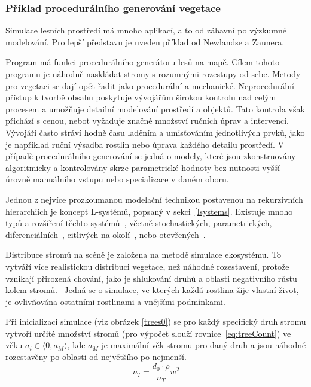 \subsubsection{Příklad procedurálního generování vegetace}
\label{proceduralExample}
Simulace lesních prostředí má mnoho aplikací, a to od zábavní po výzkumné modelování. Pro lepší představu je uveden příklad od Newlandse a Zaunera.~\cite{newlands2022procedural}

Program má funkci procedurálního generátoru lesů na mapě. Cílem tohoto programu je náhodně naskládat stromy s rozumnými rozestupy od sebe. Metody pro vegetaci se dají opět řadit jako procedurální a mechanické. Neprocedurální přístup k tvorbě obsahu poskytuje vývojářům širokou kontrolu nad celým procesem a umožňuje detailní modelování prostředí a objektů. Tato kontrola však přichází s cenou, neboť vyžaduje značné množství ručních úprav a intervencí. Vývojáři často stráví hodně času laděním a umisťováním jednotlivých prvků, jako je například ruční výsadba rostlin nebo úprava každého detailu prostředí. V případě procedurálního generování se jedná o modely, které jsou zkonstruovány algoritmicky a kontrolovány skrze parametrické hodnoty bez nutnosti vyšší úrovně manuálního vstupu nebo specializace v daném oboru.

Jednou z nejvíce prozkoumanou modelační technikou postavenou na rekurzivních hierarchiích je koncept L-systémů, popsaný v sekci~\ref{lsystems}. Existuje mnoho typů a rozšíření těchto systémů~\cite{prusinkiewicz1986graphical}, včetně stochastických, parametrických, diferenciálních~\cite{animationOfPlantDevelopment.}, citlivých na okolí~\cite{syntheticTopiary}, nebo otevřených~\cite{PrusinkiewiczModelsOfPlants}.

Distribuce stromů na scéně je založena na metodě simulace ekosystému. To vytváří více realistickou distribuci vegetace, než náhodné rozestavení, protože vznikají přirozená chování, jako je shlukování druhů a oblasti negativního růstu kolem stromů.~\cite{newlands2022procedural} Jedná se o simulace, ve kterých každá rostlina žije vlastní život, je ovlivňována ostatními rostlinami a vnějšími podmínkami.~\cite{Benes02ICCVG} 

Při inicializaci simulace (viz obrázek \ref{trees0}) se pro každý specifický druh stromu vytvoří určité množství stromů (pro výpočet slouží rovnice~\ref{eq:treeCount}) ve věku $a_i\in\langle0,a_M\rangle$, kde $a_M$ je maximální věk stromu pro daný druh a jsou náhodně rozestavěny po oblasti od největšího po nejmenší.~\cite{newlands2022procedural}
\begin{equation}
\label{eq:treeCount} 
	n_I=\frac{d_0\cdot\rho}{n_T}w^2 
\end{equation}

